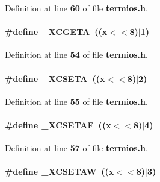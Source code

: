 Definition at line {\bf 60} of file {\bf termios.\+h}.

\paragraph[{\+\_\+\+X\+C\+G\+E\+TA}]{\setlength{\rightskip}{0pt plus 5cm}\#define \+\_\+\+X\+C\+G\+E\+TA~((\textquotesingle{}x\textquotesingle{}$<$$<$8)$\vert$1)}\label{termios_8h_a131a166f86633ce58b8fc93c7cab1a55}


Definition at line {\bf 54} of file {\bf termios.\+h}.

\paragraph[{\+\_\+\+X\+C\+S\+E\+TA}]{\setlength{\rightskip}{0pt plus 5cm}\#define \+\_\+\+X\+C\+S\+E\+TA~((\textquotesingle{}x\textquotesingle{}$<$$<$8)$\vert$2)}\label{termios_8h_a8fa874e1eab3ce04f019dd6553015d9d}


Definition at line {\bf 55} of file {\bf termios.\+h}.

\paragraph[{\+\_\+\+X\+C\+S\+E\+T\+AF}]{\setlength{\rightskip}{0pt plus 5cm}\#define \+\_\+\+X\+C\+S\+E\+T\+AF~((\textquotesingle{}x\textquotesingle{}$<$$<$8)$\vert$4)}\label{termios_8h_a0cfb6da17bffe56303258a323f858708}


Definition at line {\bf 57} of file {\bf termios.\+h}.

\paragraph[{\+\_\+\+X\+C\+S\+E\+T\+AW}]{\setlength{\rightskip}{0pt plus 5cm}\#define \+\_\+\+X\+C\+S\+E\+T\+AW~((\textquotesingle{}x\textquotesingle{}$<$$<$8)$\vert$3)}\label{termios_8h_a43e8ea2d43ca465c7c6c4bf7a81b2950}


